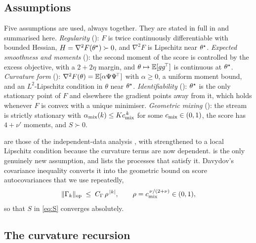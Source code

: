\subsection{Assumptions}

Five assumptions are used, always together. They are stated in full in  and
summarised here. \emph{Regularity} (): $F$ is twice continuously differentiable with
bounded Hessian, $H=\nabla^2F(\theta^\star)\succ0$, and $\nabla^2F$ is Lipschitz near $\theta^\star$.
\emph{Expected smoothness and moments} (): the second moment of the score is controlled by
the excess objective, with a $2+2\eta$ margin, and $\theta\mapsto\mathbb{E}[gg^{\!\top}]$ is continuous at
$\theta^\star$. \emph{Curvature form} (): $\nabla^2F(\theta)=\mathbb{E}[\alpha\Psi\Psi^{\!\top}]$ with
$\alpha\ge0$, a uniform moment bound, and an $L^2$-Lipschitz condition in $\theta$ near $\theta^\star$. \emph{Identifiability} (): $\theta^\star$ is
the only stationary point of $F$ and elsewhere the gradient points away from it, which holds whenever
$F$ is convex with a unique minimiser. \emph{Geometric mixing} (): the stream is strictly
stationary with $\alpha_{\mathrm{mix}}(k)\le Kc_{\mathrm{mix}}^{\,k}$ for some $c_{\mathrm{mix}}\in(0,1)$, the score has
$4+\nu'$ moments, and $S\succ0$.

 are those of the independent-data analysis
\citep{godichonbaggioni2025adaptive}, with  strengthened to a local Lipschitz condition
because the curvature terms are now dependent.  is the only genuinely new assumption, and
 lists the processes that satisfy it. Davydov's covariance inequality
\citep{davydov1968convergence} converts it into the geometric bound on score autocovariances that we use
repeatedly,
\begin{equation}
\lVert \Gamma_k \rVert_{\mathrm{op}}\;\le\;C_\Gamma\,\rho^{\,|k|},
\qquad \rho=c_{\mathrm{mix}}^{\,\nu/(2+\nu)}\in(0,1),
\label{eq:geoGamma}
\end{equation}
so that $S$ in \eqref{eq:S} converges absolutely.

\subsection{The curvature recursion}

